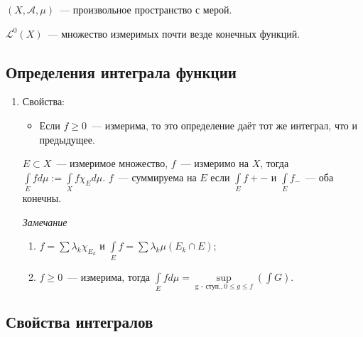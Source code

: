 \documentclass{article}
\begin{document}
        
    \newpage
                
    $(X, \mathcal{A}, \mu)$~--- произвольное пространство с мерой.
    
    $\mathcal{L}^0 (X)$~--- множество измеримых почти везде конечных функций.
    
    \subsection{Определения интеграла функции}
    
        \begin{enumerate}
                
            \item    Свойства:
                
                \begin{itemize}
                
                    \item Если $f \geqslant 0$~--- измерима, то это определение даёт тот же интеграл, что и предыдущее.
                
                \end{itemize}
            
            $E \subset X$~--- измеримое множество, $f$~--- измеримо на $X$, тогда $\int\limits_{E} f d \mu := \int\limits_{X} f \chi_E d \mu$. $f$~--- суммируема на $E$ если $\int\limits_{E} f+-$ и $\int\limits_{E} f_-$~--- оба конечны.
            
                \textit{Замечание} 
                
                    \begin{enumerate}
                    
                        \item $f = \sum \lambda_k \chi_{E_k}$ и $\int\limits_{E} f = \sum \lambda_k \mu \left( E_k \cap E \right)$;
                
                        \item $f \geqslant 0$~--- измерима, тогда $\int\limits_{E} f d \mu = \sup\limits_{\text{g - ступ.}, 0 \leqslant g \leqslant f} \left( \int G \right)$.
                        
                    \end{enumerate}
                    
        \end{enumerate}
        
    \subsection{Свойства интегралов}
    
\end{document}
